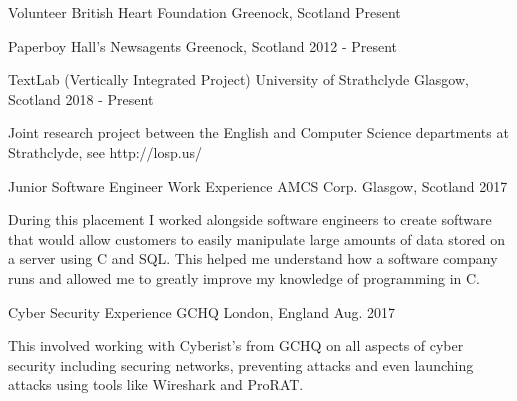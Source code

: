 

\begin{cventries}
  \cventry
    {Volunteer} %
    {British Heart Foundation} %
    {Greenock, Scotland} %
    {Present} %
    {}
    
  \cventry
    {Paperboy} %
    {Hall's Newsagents} %
    {Greenock, Scotland} %
    {2012 - Present} %
    {}
    
  \cventry
    {TextLab (Vertically Integrated Project)} %
    {University of Strathclyde} %
    {Glasgow, Scotland} %
    {2018 - Present} %
    {
      \begin{cvitems} %
        \item {Joint research project between the English and Computer Science departments at Strathclyde, see http://losp.us/}
      \end{cvitems}
    }
  \newline
  \cventry
    {Junior Software Engineer Work Experience} %
    {AMCS Corp.} %
    {Glasgow, Scotland} %
    {2017} %
    {
      \begin{cvitems} %
        \item {During this placement I worked alongside software engineers to create software that would allow customers to easily manipulate large amounts of data stored on a server using C and SQL. This helped me understand how a software company runs and allowed me to greatly improve my knowledge of programming in C. }
      \end{cvitems}
    }
  \newline
  \cventry
    {Cyber Security Experience} %
    {GCHQ} %
    {London, England} %
    {Aug. 2017} %
    {
      \begin{cvitems} %
        \item {This involved working with Cyberist’s from GCHQ on all aspects of cyber security including securing networks, preventing attacks and even launching attacks using tools like Wireshark and ProRAT.}
      \end{cvitems}
    }
  \newline


\end{cventries}
